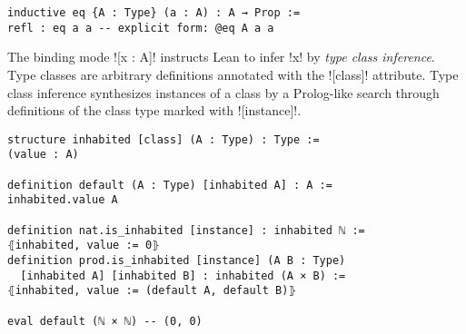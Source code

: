 \begin{verbatim}
inductive eq {A : Type} (a : A) : A → Prop :=
refl : eq a a -- explicit form: @eq A a a
\end{verbatim}

The binding mode \lean![x : A]! instructs Lean to infer \lean!x! by
\emph{type class inference}. Type classes are arbitrary definitions annotated with the
\lean![class]! attribute. Type class inference synthesizes instances of a class
by a Prolog-like search through definitions of the class type marked with \lean![instance]!.

\begin{verbatim}
structure inhabited [class] (A : Type) : Type :=
(value : A)

definition default (A : Type) [inhabited A] : A :=
inhabited.value A

definition nat.is_inhabited [instance] : inhabited ℕ :=
⦃inhabited, value := 0⦄
definition prod.is_inhabited [instance] (A B : Type)
  [inhabited A] [inhabited B] : inhabited (A × B) :=
⦃inhabited, value := (default A, default B)⦄

eval default (ℕ × ℕ) -- (0, 0)
\end{verbatim}

